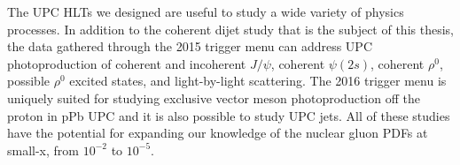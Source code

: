 The UPC HLTs we designed are useful to study a wide variety of physics processes. In addition to the coherent dijet study that is the subject of this thesis, the data gathered through the 2015 trigger menu can address UPC photoproduction of coherent and incoherent $J/\psi$, coherent $\psi(2s)$, coherent $\rho^0$, possible $\rho^0$ excited states, and light-by-light scattering. The 2016 trigger menu is uniquely suited for studying exclusive vector meson photoproduction off the proton in pPb UPC and it is also possible to study UPC jets. All of these studies have the potential for expanding our knowledge of the nuclear gluon PDFs at small-x, from $10^{-2}$ to $10^{-5}$.  
